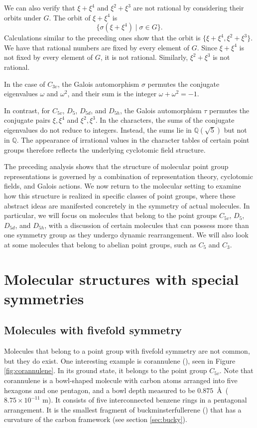 \documentclass{article}
\begin{document}
    We can also verify that $\xi+\xi^4$ and $\xi^2+\xi^3$ are not rational by considering their orbits under $G$. The orbit of $\xi+\xi^4$ is \[\{\sigma(\xi+\xi^4)\mid \sigma\in G\}.\] Calculations similar to the preceding ones show that the orbit is $\{\xi+\xi^4,\xi^2+\xi^3\}$. We have that rational numbers are fixed by every element of $G$. Since $\xi+\xi^4$ is not fixed by every element of $G$, it is not rational. Similarly, $\xi^2+\xi^3$ is not rational.

    In the case of $C_{3v}$, the Galois automorphism $\sigma$ permutes the conjugate eigenvalues $\omega$ and $\omega^2$, and their sum is the integer $\omega + \omega^2=-1$.

    In contrast, for $C_{5v}$, $D_5$, $D_{5d}$, and $D_{5h}$, the Galois automorphism $\tau$ permutes the conjugate pairs $\xi, \xi^4$ and $\xi^2, \xi^3$. In the characters, the sums of the conjugate eigenvalues do not reduce to integers. Instead, the sums lie in $\mathbb{Q}(\sqrt{5})$ but not in $\mathbb{Q}$. The appearance of irrational values in the character tables of certain point groups therefore reflects the underlying cyclotomic field structure.

    The preceding analysis shows that the structure of molecular point group representations is governed by a combination of representation theory, cyclotomic fields, and Galois actions. We now return to the molecular setting to examine how this structure is realized in specific classes of point groups, where these abstract ideas are manifested concretely in the symmetry of actual molecules. In particular, we will focus on molecules that belong to the point groups $C_{5v}$, $D_5$, $D_{5d}$, and $D_{5h}$, with a discussion of certain molecules that can possess more than one symmetry group as they undergo dynamic rearrangement. We will also look at some molecules that belong to abelian point groups, such as $C_5$ and $C_3$.

    \pagebreak   

    \section{Molecular structures with special symmetries}

    \subsection{Molecules with fivefold symmetry}

    Molecules that belong to a point group with fivefold symmetry are not common, but they do exist. One interesting example is corannulene (), seen in Figure \ref{fig:corannulene}. In its ground state, it belongs to the point group $C_{5v}$. Note that corannulene is a bowl-shaped molecule with carbon atoms arranged into five hexagons and one pentagon, and a bowl depth measured to be $0.875$~\AA~($8.75\times10^{-11}$ m). It consists of five interconnected benzene rings in a pentagonal arrangement. It is the smallest fragment of buckminsterfullerene () that has a curvature of the carbon framework (see section \ref{sec:bucky}). \cite{mattarella}
\end{document}
